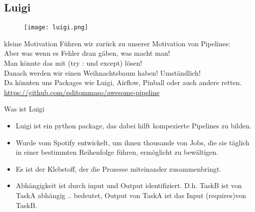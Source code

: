 \documentclass[t]{beamer}       %
\begin{document}
\subsection{Luigi}


\begin{frame}
\begin{figure}
\texttt{[image: luigi.png]}
\end{figure}
\end{frame}


\begin{frame}{kleine Motivation}
Führen wir zurück zu unserer Motivation von Pipelines:\\
Aber was wenn es Fehler dran gäben, was macht man!\\
Man könnte das mit (try : und except) lösen!\\
Danach werden  wir einen Weihnachtsbaum haben! Umständlich!\\
Da könnten uns Packages wie Luigi, Airflow, Pinball oder auch andere retten.\\
\url{https://github.com/pditommaso/awesome-pipeline}
\end{frame}


\begin{frame}{Was ist Luigi}
\begin{itemize}
\item Luigi ist ein python package, das dabei hilft kompezierte Pipelines zu bilden.
\item Wurde vom Spotify entwickelt, um ihnen thousande von Jobs, die sie täglich  in einer bestimmten Reihenfolge führen,  ermöglicht zu bewältigen.
\item Es ist der Klebstoff, der die Prozesse miteinander zusammenbringt.
\item Abhängigkeit ist durch input und Output identifiziert. D.h. TaskB ist von TaskA abhängig .. bedeutet, Output von TaskA ist das Input (requires)von TaskB.

\end{itemize}
\end{frame}
\end{document}
